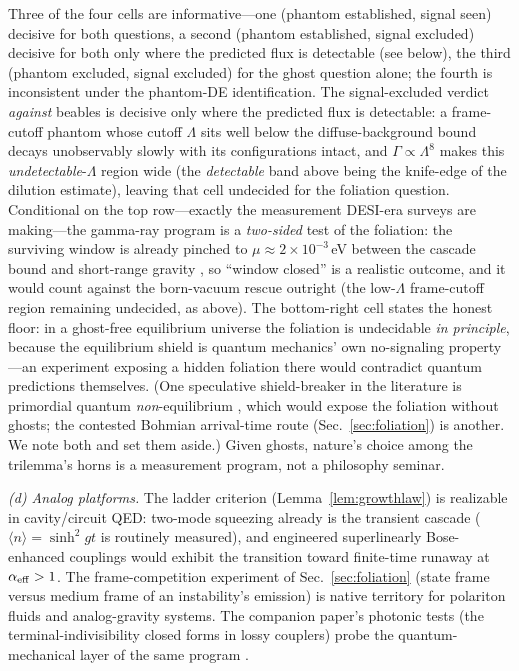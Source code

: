 \documentclass[11pt]{article}
\theoremstyle{definition}
\theoremstyle{remark}
\newcommand{\avg}[1]{\langle #1 \rangle}
\begin{document}
Three of the four cells are informative---one (phantom established,
signal seen) decisive for both questions, a second (phantom established,
signal excluded) decisive for both only where the predicted flux is
detectable (see below), the third (phantom excluded, signal excluded) for the ghost question
alone; the fourth is inconsistent under the phantom-DE identification. The signal-excluded verdict
\emph{against} beables is decisive only where the predicted flux is
detectable: a frame-cutoff phantom whose cutoff $\Lambda$ sits well
below the diffuse-background bound decays unobservably slowly with its
configurations intact, and $\Gamma\propto\Lambda^{8}$ makes this
\emph{undetectable}-$\Lambda$ region wide (the \emph{detectable} band
above being the knife-edge of the dilution estimate), leaving that cell
undecided for the foliation question.
Conditional on the top row---exactly the measurement DESI-era
surveys are making---the gamma-ray program is a \emph{two-sided}
test of the foliation: the surviving window is already pinched to
$\mu\approx2\times10^{-3}\,$eV between the cascade bound and
short-range gravity \cite{GV2013}, so ``window closed'' is a
realistic outcome, and it would count against the born-vacuum rescue
outright (the low-$\Lambda$ frame-cutoff region remaining undecided, as
above). The bottom-right cell states the honest
floor: in a ghost-free equilibrium universe the foliation is
undecidable \emph{in principle}, because the equilibrium shield is
quantum mechanics' own no-signaling property---an experiment
exposing a hidden foliation there would contradict quantum
predictions themselves. (One speculative shield-breaker in the
literature is primordial quantum \emph{non}-equilibrium
\cite{Valentini2007}, which would expose the foliation without
ghosts; the contested Bohmian arrival-time route
(Sec.~\ref{sec:foliation}) \cite{AmblardDrezet} is another. We note
both and set them aside.) Given ghosts, nature's choice
among the trilemma's horns is a measurement program, not a
philosophy seminar.

\emph{(d) Analog platforms.} The ladder criterion
(Lemma~\ref{lem:growthlaw}) is realizable in cavity/circuit QED:
two-mode squeezing already is the transient cascade
($\avg n=\sinh^{2}gt$ is routinely measured), and engineered
superlinearly Bose-enhanced couplings would exhibit the transition
toward finite-time runaway at $\alpha_{\rm eff}>1$. The
frame-competition experiment of Sec.~\ref{sec:foliation} (state frame
versus medium frame of an instability's emission) is native territory
for polariton fluids and analog-gravity systems. The companion
paper's photonic tests (the terminal-indivisibility closed forms in
lossy couplers) probe the quantum-mechanical layer of the same
program \cite{indivisible}.
\end{document}
